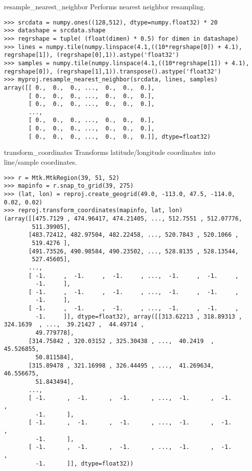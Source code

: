 \documentclass{howto}
\begin{document}
\begin{methoddesc}{resample_nearest_neighbor}{}
    Performs nearest neighbor resampling.

\begin{verbatim}
>>> srcdata = numpy.ones((128,512), dtype=numpy.float32) * 20
>>> datashape = srcdata.shape
>>> regrshape = tuple( (float(dimen) * 0.5) for dimen in datashape)
>>> lines = numpy.tile(numpy.linspace(4.1,((10*regrshape[0]) + 4.1), regrshape[1]), (regrshape[0],1)).astype('float32')
>>> samples = numpy.tile(numpy.linspace(4.1,((10*regrshape[1]) + 4.1), regrshape[0]), (regrshape[1],1)).transpose().astype('float32')
>>> myproj.resample_nearest_neighbor(srcdata, lines, samples)
array([[ 0.,  0.,  0., ...,  0.,  0.,  0.],
       [ 0.,  0.,  0., ...,  0.,  0.,  0.],
       [ 0.,  0.,  0., ...,  0.,  0.,  0.],
       ...,
       [ 0.,  0.,  0., ...,  0.,  0.,  0.],
       [ 0.,  0.,  0., ...,  0.,  0.,  0.],
       [ 0.,  0.,  0., ...,  0.,  0.,  0.]], dtype=float32)
\end{verbatim}
\end{methoddesc}

\begin{methoddesc}{transform_coordinates}{}
  Transforms latitude/longitude coordinates into line/sample coordinates.

\begin{verbatim}
>>> r = Mtk.MtkRegion(39, 51, 52)
>>> mapinfo = r.snap_to_grid(39, 275)
>>> (lat, lon) = reproj.create_geogrid(49.0, -113.0, 47.5, -114.0, 0.02, 0.02)
>>> reproj.transform_coordinates(mapinfo, lat, lon)
(array([[475.7129 , 474.96417, 474.21405, ..., 512.7551 , 512.07776,
        511.39905],
       [483.72412, 482.97504, 482.22458, ..., 520.7843 , 520.1066 ,
        519.4276 ],
       [491.73526, 490.98584, 490.23502, ..., 528.8135 , 528.13544,
        527.45605],
       ...,
       [ -1.     ,  -1.     ,  -1.     , ...,  -1.     ,  -1.     ,
         -1.     ],
       [ -1.     ,  -1.     ,  -1.     , ...,  -1.     ,  -1.     ,
         -1.     ],
       [ -1.     ,  -1.     ,  -1.     , ...,  -1.     ,  -1.     ,
         -1.     ]], dtype=float32), array([[313.62213 , 318.89313 , 324.1639  , ...,  39.21427 ,  44.49714 ,
         49.779778],
       [314.75842 , 320.03152 , 325.30438 , ...,  40.2419  ,  45.526855,
         50.811584],
       [315.89478 , 321.16998 , 326.44495 , ...,  41.269634,  46.556675,
         51.843494],
       ...,
       [ -1.      ,  -1.      ,  -1.      , ...,  -1.      ,  -1.      ,
         -1.      ],
       [ -1.      ,  -1.      ,  -1.      , ...,  -1.      ,  -1.      ,
         -1.      ],
       [ -1.      ,  -1.      ,  -1.      , ...,  -1.      ,  -1.      ,
         -1.      ]], dtype=float32))
\end{verbatim}
\end{methoddesc}
\end{document}
